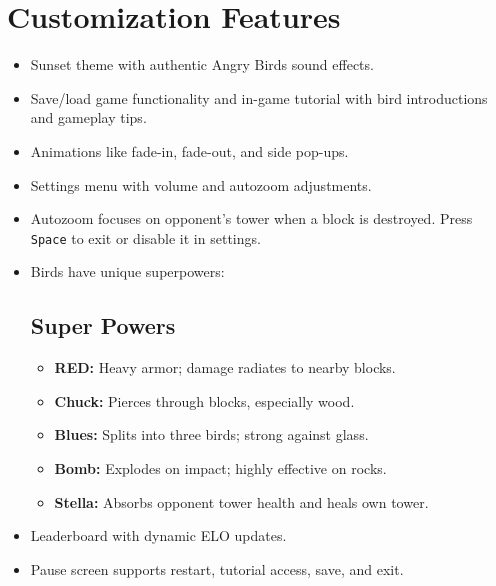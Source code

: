 \documentclass[10pt]{article}
\begin{document}
\section{Customization Features}\label{sec:features}
\begin{itemize}
    \item Sunset theme with authentic Angry Birds sound effects.
    \item Save/load game functionality and in-game tutorial with bird introductions and gameplay tips.
    \item Animations like fade-in, fade-out, and side pop-ups.
    \item Settings menu with volume and autozoom adjustments.
    \item Autozoom focuses on opponent's tower when a block is destroyed. Press \texttt{Space} to exit or disable it in settings.
    \item Birds have unique superpowers:
    \subsection*{Super Powers}
    \begin{itemize}
        \item \textbf{RED:} Heavy armor; damage radiates to nearby blocks.
        \item \textbf{Chuck:} Pierces through blocks, especially wood.
        \item \textbf{Blues:} Splits into three birds; strong against glass.
        \item \textbf{Bomb:} Explodes on impact; highly effective on rocks.
        \item \textbf{Stella:} Absorbs opponent tower health and heals own tower.
    \end{itemize}
    \item Leaderboard with dynamic ELO updates.
    \item Pause screen supports restart, tutorial access, save, and exit.
\end{itemize}
\end{document}

